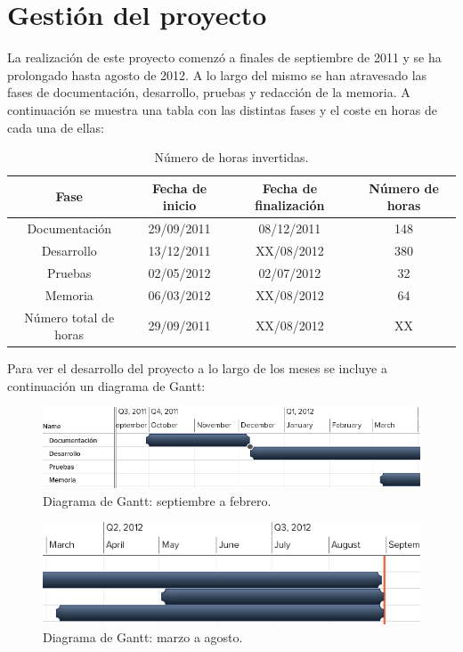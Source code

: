 \chapter{Gestión del proyecto}
\label{anx:gestion}



La realización de este proyecto comenzó a finales de septiembre de 2011 y se ha prolongado hasta agosto de 2012. A lo largo del mismo se han atravesado las fases de documentación, desarrollo, pruebas y redacción de la memoria. A continuación se muestra una tabla con las distintas fases y el coste en horas de cada una de ellas:

\begin{table}[!htbp]
\centering
   \begin{tabular}{|c|c|c|c|}
      \hline
      \textbf{Fase} & \textbf{Fecha de inicio} & \textbf{Fecha de finalización} & \textbf{Número de horas} \\ \hline
      Documentación & 29/09/2011 & 08/12/2011 & 148 \\ \hline
      Desarrollo & 13/12/2011 & XX/08/2012 & 380 \\ \hline
      Pruebas & 02/05/2012 & 02/07/2012 & 32 \\ \hline
      Memoria & 06/03/2012 & XX/08/2012 & 64 \\ \hline
      \hline
      Número total de horas & 29/09/2011 & XX/08/2012 & XX \\ \hline
   \end{tabular}
\caption{Número de horas invertidas.}
\label{table:horas}
\end{table}

Para ver el desarrollo del proyecto a lo largo de los meses se incluye a continuación un diagrama de Gantt:

\begin{figure} [!htbp]
  \centering
  \includegraphics[width=13.5cm]{imagenes/gantt1.png}
  \caption{Diagrama de Gantt: septiembre a febrero.}
\label{figure:gantt1}
\end{figure}

\begin{figure} [!htbp]
  \centering
  \includegraphics[width=13.5cm]{imagenes/gantt2.png}
  \caption{Diagrama de Gantt: marzo a agosto.}
\label{figure:gantt2}
\end{figure}

